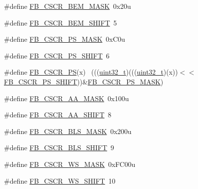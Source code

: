 \begin{DoxyCompactItemize}
\item 
\#define \hyperlink{group___f_b___register___masks_gaef7f70f7c6d39c8e1de2a16ccb4b3ccb}{F\+B\+\_\+\+C\+S\+C\+R\+\_\+\+B\+E\+M\+\_\+\+M\+A\+SK}~0x20u
\item 
\#define \hyperlink{group___f_b___register___masks_ga2dd3f47a9401af7ae8838b7dc7c379f8}{F\+B\+\_\+\+C\+S\+C\+R\+\_\+\+B\+E\+M\+\_\+\+S\+H\+I\+FT}~5
\item 
\#define \hyperlink{group___f_b___register___masks_ga07623c4ea4b4dfdc64c7dc0431719350}{F\+B\+\_\+\+C\+S\+C\+R\+\_\+\+P\+S\+\_\+\+M\+A\+SK}~0x\+C0u
\item 
\#define \hyperlink{group___f_b___register___masks_ga2cd33266c104fc645dcadaea7e659aa8}{F\+B\+\_\+\+C\+S\+C\+R\+\_\+\+P\+S\+\_\+\+S\+H\+I\+FT}~6
\item 
\#define \hyperlink{group___f_b___register___masks_ga6056baabcdce2969870d89284a4e043f}{F\+B\+\_\+\+C\+S\+C\+R\+\_\+\+PS}(x)                                                    ~(((\hyperlink{_p_e___types_8h_a33594304e786b158f3fb30289278f5af}{uint32\+\_\+t})(((\hyperlink{_p_e___types_8h_a33594304e786b158f3fb30289278f5af}{uint32\+\_\+t})(x))$<$$<$\hyperlink{group___f_b___register___masks_ga2cd33266c104fc645dcadaea7e659aa8}{F\+B\+\_\+\+C\+S\+C\+R\+\_\+\+P\+S\+\_\+\+S\+H\+I\+FT}))\&\hyperlink{group___f_b___register___masks_ga07623c4ea4b4dfdc64c7dc0431719350}{F\+B\+\_\+\+C\+S\+C\+R\+\_\+\+P\+S\+\_\+\+M\+A\+SK})
\item 
\#define \hyperlink{group___f_b___register___masks_gae26d2b6451432c0000d30a23e541020f}{F\+B\+\_\+\+C\+S\+C\+R\+\_\+\+A\+A\+\_\+\+M\+A\+SK}~0x100u
\item 
\#define \hyperlink{group___f_b___register___masks_gaf3d9d750b7dddf0d1df65c98d7ecc7e1}{F\+B\+\_\+\+C\+S\+C\+R\+\_\+\+A\+A\+\_\+\+S\+H\+I\+FT}~8
\item 
\#define \hyperlink{group___f_b___register___masks_gac8f4e3d4dba2c5e902c51e82cd870d9f}{F\+B\+\_\+\+C\+S\+C\+R\+\_\+\+B\+L\+S\+\_\+\+M\+A\+SK}~0x200u
\item 
\#define \hyperlink{group___f_b___register___masks_gabbdaea319c238ce8fc0ba6d79e29b411}{F\+B\+\_\+\+C\+S\+C\+R\+\_\+\+B\+L\+S\+\_\+\+S\+H\+I\+FT}~9
\item 
\#define \hyperlink{group___f_b___register___masks_gaf6ddd3e9e267951e4af3886b8bf0c54e}{F\+B\+\_\+\+C\+S\+C\+R\+\_\+\+W\+S\+\_\+\+M\+A\+SK}~0x\+F\+C00u
\item 
\#define \hyperlink{group___f_b___register___masks_ga32c1c45a903fe04d1a3ffc5c2f95254f}{F\+B\+\_\+\+C\+S\+C\+R\+\_\+\+W\+S\+\_\+\+S\+H\+I\+FT}~10
\item 
$$
\end{DoxyCompactItemize}
